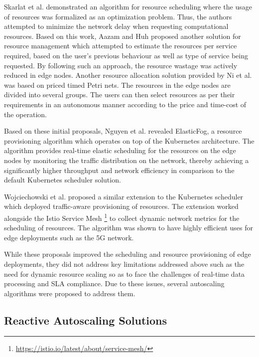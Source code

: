 Skarlat et al. \cite{skarlat2016resource} demonstrated an algorithm for resource scheduling where the usage of resources was formalized as an optimization problem. Thus, the authors attempted to minimize the network delay when requesting computational resources. Based on this work, Aazam and Huh \cite{aazam2015dynamic} proposed another solution for resource management which attempted to estimate the resources per service required, based on the user's previous behaviour as well as type of service being requested. By following such an approach, the resource wastage was actively reduced in edge nodes. Another resource allocation solution provided by Ni et al. \cite{ni2017resource} was based on priced timed Petri nets. The resources in the edge nodes are divided into several groups. The users can then select resources as per their requirements in an autonomous manner according to the price and time-cost of the operation.\par

Based on these initial proposals, Nguyen et al. \cite{nguyen2020elasticfog} revealed ElasticFog, a resource provisioning algorithm which operates on top of the Kubernetes architecture. The algorithm provides real-time elastic scheduling for the resources on the edge nodes by monitoring the traffic distribution on the network, thereby achieving a significantly higher throughput and network efficiency in comparison to the default Kubernetes scheduler solution.\par

Wojciechowski et al. \cite{wojciechowski2021netmarks} proposed a similar extension to the Kubernetes scheduler which deployed traffic-aware provisioning of resources. The extension worked alongside the Istio Service Mesh \footnote{\url{https://istio.io/latest/about/service-mesh/}} to collect dynamic network metrics for the scheduling of resources. The algorithm was shown to have highly efficient uses for edge deployments such as the 5G network.\par

While these proposals improved the scheduling and resource provisioning of edge deployments, they did not address key limitations addressed above such as the need for dynamic resource scaling so as to face the challenges of real-time data processing and SLA compliance. Due to these issues, several autoscaling algorithms were proposed to address them.

\subsection{Reactive Autoscaling Solutions}
\label{subsec:reactive-solutions}

